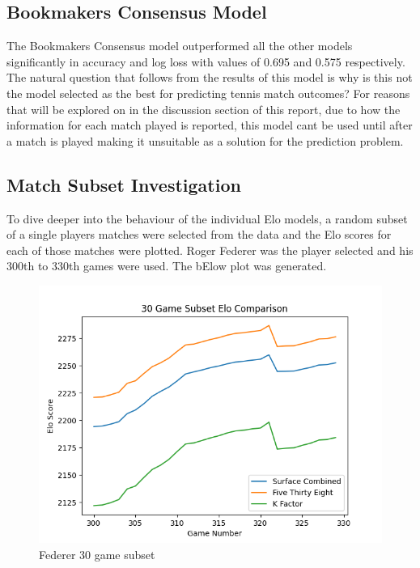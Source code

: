 \documentclass[12pt,a4paper]{article}
\begin{document}
\subsection{Bookmakers Consensus Model}
The Bookmakers Consensus model outperformed all the other models significantly in accuracy
and log loss with values of 0.695 and 0.575 respectively. The natural question that follows
from the results of this model is why is this not the model selected as the best for
predicting tennis match outcomes? For reasons that will be explored on in the discussion
section of this report, due to how the information for each match played is reported, this
model cant be used until after a match is played making it unsuitable as a solution for
the prediction problem.

\subsection{Match Subset Investigation}
To dive deeper into the behaviour of the individual Elo models, a random subset of a single players
matches were selected from the data and the Elo scores for each of those matches were
plotted. Roger Federer was the player selected and his 300th to 330th games were used.
The bElow plot was generated.

\begin{figure}[H]
  \centering
  \includegraphics[scale=0.8]{images/30_game_subset.png}
  \caption{Federer 30 game subset}
  \label{fig:federer-30}
\end{figure}
\end{document}
